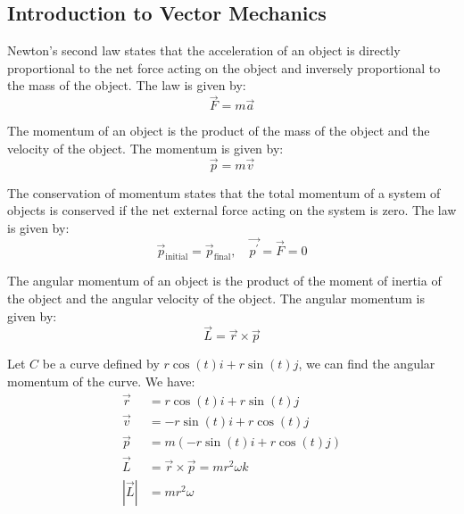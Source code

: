 \documentclass[11pt]{report}
\begin{document}
\subsection{Introduction to Vector Mechanics}
\begin{definition}
    Newton's second law states that the acceleration of an object is directly proportional to the net force acting on the object and inversely proportional to the mass of the object. The law is given by:
    \begin{equation}
        \vec{F} = m\vec{a}
    \end{equation}
\end{definition}
\begin{definition}[Momentum]
    The momentum of an object is the product of the mass of the object and the velocity of the object. The momentum is given by:
    \begin{equation}
        \vec{p} = m\vec{v}
    \end{equation}
\end{definition}
\begin{definition}
    The conservation of momentum states that the total momentum of a system of objects is conserved if the net external force acting on the system is zero. The law is given by:
    \begin{equation}
        \vec{p}_{\text{initial}} = \vec{p}_{\text{final}}, \quad \vec{p^\prime} = \vec{F} = 0
    \end{equation}
\end{definition}
\begin{definition}
    The angular momentum of an object is the product of the moment of inertia of the object and the angular velocity of the object. The angular momentum is given by:
    \begin{equation}
        \vec{L} = \vec{r} \times \vec{p}
    \end{equation}
\end{definition}
\begin{example}
    Let $C$ be a curve defined by $r\cos(t)i + r\sin(t)j$, we can find the angular momentum of the curve. We have:
    \begin{align*}
        \vec{r} &= r\cos(t)i + r\sin(t)j \\
        \vec{v} &= -r\sin(t)i + r\cos(t)j \\
        \vec{p} &= m(-r\sin(t)i + r\cos(t)j) \\
        \vec{L} &= \vec{r} \times \vec{p} = mr^2\omega k \\
        |\vec{L}| &= mr^2\omega
    \end{align*}
\end{example}
\end{document}
